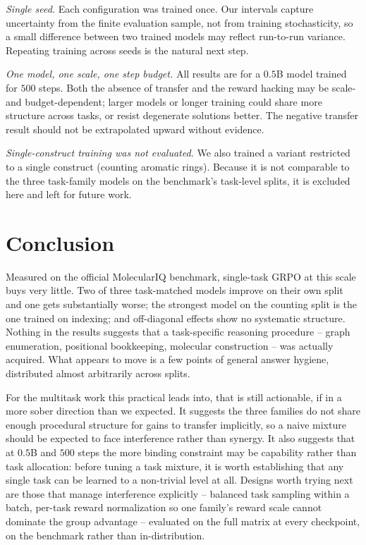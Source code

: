 \documentclass[a4paper,oneside,10pt,ngerman,english]{scrartcl}
\begin{document}
\emph{Single seed.} Each configuration was trained once. Our intervals capture
uncertainty from the finite evaluation sample, not from training stochasticity,
so a small difference between two trained models may reflect run-to-run
variance. Repeating training across seeds is the natural next step.

\emph{One model, one scale, one step budget.} All results are for a $0.5$B model
trained for $500$ steps. Both the absence of transfer and the reward hacking may
be scale- and budget-dependent; larger models or longer training could share more
structure across tasks, or resist degenerate solutions better. The negative
transfer result should not be extrapolated upward without evidence.

\emph{Single-construct training was not evaluated.} We also trained a variant
restricted to a single construct (counting aromatic rings). Because it is not
comparable to the three task-family models on the benchmark's task-level splits,
it is excluded here and left for future work.

\section{Conclusion}
\label{sec:conclusion}

Measured on the official MolecularIQ benchmark, single-task GRPO at this scale
buys very little. Two of three task-matched models improve on their own split
and one gets substantially worse; the strongest model on the counting split is
the one trained on indexing; and off-diagonal effects show no systematic
structure. Nothing in the results suggests that a task-specific reasoning
procedure -- graph enumeration, positional bookkeeping, molecular construction --
was actually acquired. What appears to move is a few points of general answer
hygiene, distributed almost arbitrarily across splits.

For the multitask work this practical leads into, that is still actionable, if
in a more sober direction than we expected. It suggests the three families do not
share enough procedural structure for gains to transfer implicitly, so a naive
mixture should be expected to face interference rather than synergy. It also
suggests that at $0.5$B and $500$ steps the more binding constraint may be
capability rather than task allocation: before tuning a task mixture, it is worth
establishing that any single task can be learned to a non-trivial level at all.
Designs worth trying next are those that manage interference explicitly --
balanced task sampling within a batch, per-task reward normalization so one
family's reward scale cannot dominate the group advantage -- evaluated on the
full matrix at every checkpoint, on the benchmark rather than in-distribution.
\end{document}
